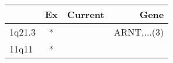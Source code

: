\begin{tabular}{lccr}
\toprule
{} & Ex & Current &         Gene \\
\midrule
1q21.3 &  * &         &  ARNT,...(3) \\
11q11  &  * &         &              \\
\bottomrule
\end{tabular}
